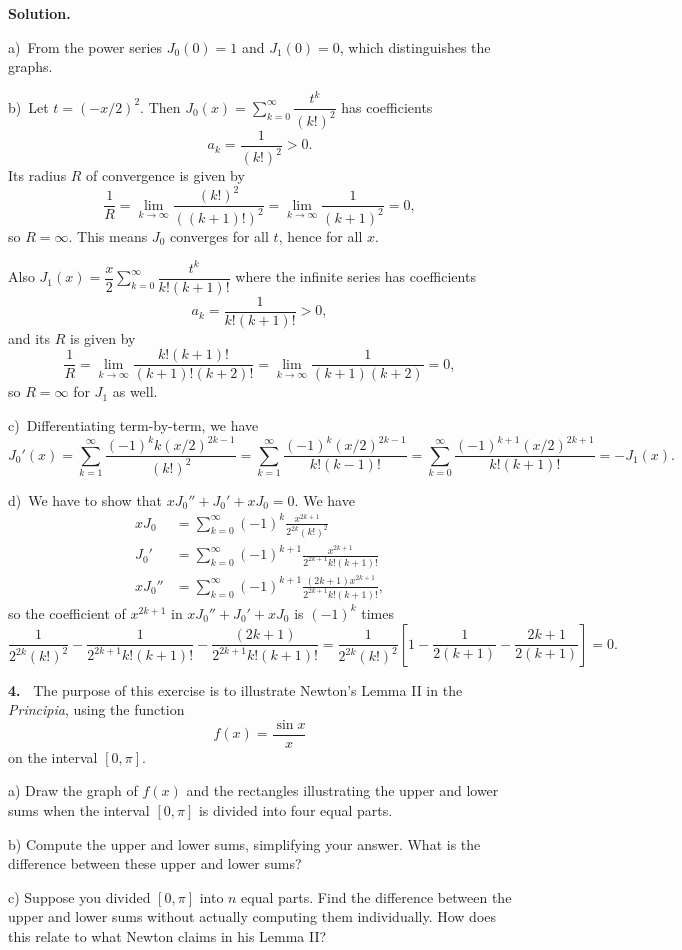 \documentclass[12pt]{article}
\theoremstyle{definition}
\theoremstyle{remark}
\theoremstyle{definition}
\newenvironment{Solution}{\noindent\textbf{Solution.}}{}
\begin{document}
\begin{Solution}

a)\  From the power series $J_0(0)=1$ and $J_1(0)=0$, which distinguishes the graphs. 

b)\ Let $t=(-x/2)^2$. Then $J_0(x)=\sum\limits_{k=0}^\infty\dfrac{t^{k}}{(k!)^2}$
has coefficients 
\[a_k=\frac{1}{(k!)^2}>0.\]
Its radius $R$ of convergence is given by
\[\frac{1}{R}=\lim_{k\to\infty}\frac{(k!)^2}{((k+1)!)^2}=\lim_{k\to\infty}\frac{1}{(k+1)^2}=0,\]
so $R=\infty$.  This means $J_0$ converges for all $t$, hence for all $x$. 

Also $J_1(x)=\dfrac{x}{2}\sum\limits_{k=0}^\infty\dfrac{t^{k}}{k!(k+1)!}$ where the infinite series 
has coefficients 
\[a_k=\frac{1}{k!(k+1)!}>0,\]
and its $R$ is given by 
\[\frac{1}{R}=\lim_{k\to\infty}\frac{k!(k+1)!}{(k+1)!(k+2)!}=\lim_{k\to\infty}\frac{1}{(k+1)(k+2)}=0,\]
so $R=\infty$ for $J_1$ as well. 

c)\ Differentiating term-by-term, we have 
\[J_0'(x)=\sum_{k=1}^\infty\frac{(-1)^kk(x/2)^{2k-1}}{(k!)^2}
=\sum_{k=1}^\infty\frac{(-1)^k(x/2)^{2k-1}}{k!(k-1)!}
=\sum_{k=0}^\infty\frac{(-1)^{k+1}(x/2)^{2k+1}}{k!(k+1)!}
=-J_1(x).
\]

d)\ We have to show that $xJ_0''+J_0'+xJ_0=0$. We have 
\[\begin{split}
xJ_0&=\sum_{k=0}^\infty(-1)^k\frac{x^{2k+1}}{2^{2k}(k!)^2}\\
J_0'&=\sum_{k=0}^\infty(-1)^{k+1}\frac{x^{2k+1}}{2^{2k+1}k!(k+1)!}\\
xJ_0''&=\sum_{k=0}^\infty(-1)^{k+1}\frac{(2k+1)x^{2k+1}}{2^{2k+1}k!(k+1)!},
\end{split}
\]
so the coefficient of $x^{2k+1}$ in $xJ_0''+J_0'+xJ_0$ is $(-1)^k$ times
\[\frac{1}{2^{2k}(k!)^2}-\frac{1}{2^{2k+1}k!(k+1)!}-\frac{(2k+1)}{2^{2k+1}k!(k+1)!}
=\frac{1}{2^{2k}(k!)^2}\left[1-\frac{1}{2(k+1)}-\frac{2k+1}{2(k+1)}\right]=0.
\]


\end{Solution}
\newpage
{\bf 4.\ }  The purpose of this exercise is to illustrate  Newton's Lemma II in the {\it Principia}, using the function 
\[f(x)=\frac{\sin x}{x}\]
on the interval $[0,\pi]$. 

a) Draw the graph of $f(x)$ and the rectangles illustrating the upper and lower sums when the interval $[0,\pi]$ is divided into four equal parts. 

b) Compute the upper and lower sums, simplifying your answer. What is the difference between these upper and lower sums?

c) Suppose you divided $[0,\pi]$ into $n$ equal parts. Find the difference  between the upper and lower sums without actually computing them individually. How does this relate to what Newton claims in his Lemma II?
\end{document}
